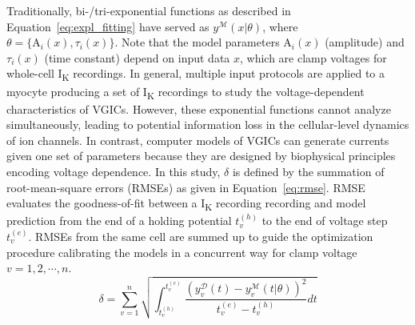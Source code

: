 \documentclass[11pt]{article}
\begin{document}
Traditionally, bi-/tri-exponential functions as described in Equation~\ref{eq:expl_fitting} have served as $y^{\mathcal{M}}(x|\theta)$, where $\theta=\{\mathrm{A}_{i}(x),\tau_{i}(x)\}$. Note that the model parameters $\mathrm{A}_{i}(x)$ (amplitude) and $\tau_{i}(x)$ (time constant) depend on input data $x$, which are clamp voltages for whole-cell I\textsubscript{K} recordings. In general, multiple input protocols are applied to a myocyte producing a set of I\textsubscript{K} recordings to study the voltage-dependent characteristics of VGICs. However, these exponential functions cannot analyze simultaneously, leading to potential information loss in the cellular-level dynamics of ion channels. In contrast, computer models of VGICs can generate currents given one set of parameters because they are designed by biophysical principles encoding voltage dependence. In this study, $\delta$ is defined by the summation of root-mean-square errors (RMSEs) as given in Equation~\ref{eq:rmse}. RMSE evaluates the goodness-of-fit between a I\textsubscript{K} recording recording and model prediction from the end of a holding potential $t_v^{(h)}$ to the end of voltage step $t_v^{(e)}$. RMSEs from the same cell are summed up to guide the optimization procedure calibrating the models in a concurrent way for clamp voltage $v=1,2,\cdots,n$.
\begin{equation}
    \label{eq:rmse}
    \delta = \sum_{v=1}^{n} \sqrt{\int_{t_v^{(h)}}^{t_v^{(e)}}\frac{(y_v^{\mathcal{D}}(t) - y_v^{\mathcal{M}}(t|\theta))^2}{t_v^{(e)}-t_v^{(h)}}dt}
\end{equation}
\end{document}
